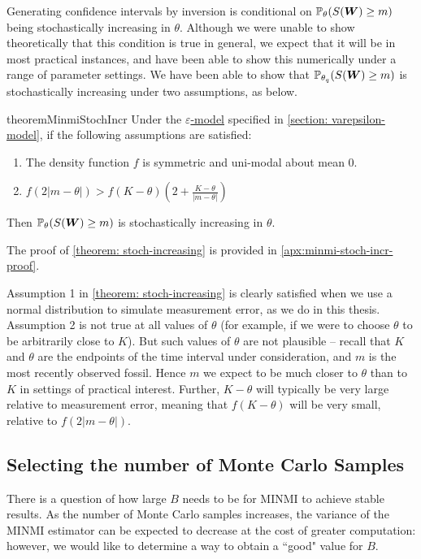 Generating confidence intervals by inversion is conditional on $\mathbb{P}_{\theta} (S(\bm{W}) \geq m)$ being stochastically increasing in $\theta$. Although we were unable to show theoretically that this condition is true in general, we expect that it will be in most practical instances, and have been able to show this numerically under a range of parameter settings. We have been able to show that $\mathbb{P}_{\theta_q} (S(\bm{W}) \geq m)$ is stochastically increasing under two assumptions, as below.
\begin{restatable}{theorem}{MinmiStochIncr}\label{theorem: stoch-increasing}
    Under the \hyperref[model: measurement-error]{$\varepsilon$-model} specified in \autoref{section: varepsilon-model}, if the following assumptions are satisfied:
    \begin{enumerate}
        \item The density function $f$ is symmetric and uni-modal about mean 0.
        \item $f(2|m-\theta|) > f(K-\theta) \left(2 + \frac{K-\theta}{|m-\theta|} \right)$
    \end{enumerate}
    Then $\mathbb{P}_{\theta} (S(\bm{W}) \geq m)$ is stochastically increasing in $\theta$.
\end{restatable}

The proof of \autoref{theorem: stoch-increasing} is provided in \autoref{apx:minmi-stoch-incr-proof}.

Assumption 1 in \autoref{theorem: stoch-increasing} is clearly satisfied when we use a normal distribution to simulate measurement error, as we do in this thesis. Assumption 2 is not true at all values of $\theta$ (for example, if we were to choose $\theta$ to be arbitrarily close to $K$). But such values of $\theta$ are not plausible -- recall that $K$ and $\theta$ are the endpoints of the time interval under consideration, and $m$ is the most recently observed fossil. Hence $m$ we expect to be much closer to $\theta$ than to $K$ in settings of practical interest. Further, $K-\theta$ will typically be very large relative to measurement error, meaning that $f(K-\theta)$ will be very small, relative to $f(2|m-\theta|)$.

\subsection{Selecting the number of Monte Carlo Samples}\label{subsec:minmi-mce-var}

There is a question of how large $B$ needs to be for MINMI to achieve stable results. As the number of Monte Carlo samples increases, the variance of the MINMI estimator can be expected to decrease at the cost of greater computation: however, we would like to determine a way to obtain a ``good" value for $B$.

